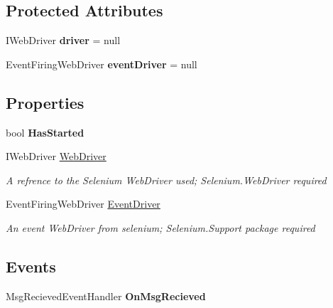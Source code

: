 \subsection*{Protected Attributes}
\begin{DoxyCompactItemize}
\item 
\mbox{\label{class_web_whatsapp_a_p_i_1_1_base_class_a2887b40fd1edaad98a26848369f83864}} 
I\+Web\+Driver {\bfseries driver} = null
\item 
\mbox{\label{class_web_whatsapp_a_p_i_1_1_base_class_a10068a3275629827584bda048227c456}} 
Event\+Firing\+Web\+Driver {\bfseries event\+Driver} = null
\end{DoxyCompactItemize}
\subsection*{Properties}
\begin{DoxyCompactItemize}
\item 
\mbox{\label{class_web_whatsapp_a_p_i_1_1_base_class_ac579478d77363feb4ffde2e9bcf48c21}} 
bool {\bfseries Has\+Started}
\item 
I\+Web\+Driver \hyperlink{class_web_whatsapp_a_p_i_1_1_base_class_afc0c364092139747b980a1ad6b1e2321}{Web\+Driver}
\begin{DoxyCompactList}\small\item\em A refrence to the Selenium Web\+Driver used; Selenium.\+Web\+Driver required \end{DoxyCompactList}\item 
Event\+Firing\+Web\+Driver \hyperlink{class_web_whatsapp_a_p_i_1_1_base_class_a1db62394318cea6839e32f2820fb426f}{Event\+Driver}
\begin{DoxyCompactList}\small\item\em An event Web\+Driver from selenium; Selenium.\+Support package required \end{DoxyCompactList}\end{DoxyCompactItemize}
\subsection*{Events}
\begin{DoxyCompactItemize}
\item 
\mbox{\label{class_web_whatsapp_a_p_i_1_1_base_class_a5baefb689c909b3db1816d274ea9596b}} 
Msg\+Recieved\+Event\+Handler {\bfseries On\+Msg\+Recieved}
\end{DoxyCompactItemize}


